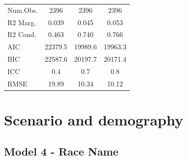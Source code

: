 \documentclass[]{report}
\begin{document}
\begin{table}
{\begin{tabular}[t]{lccc}
		\midrule
		Num.Obs. & \num{2396} & \num{2396} & \num{2396}\\
		R2 Marg. & \num{0.039} & \num{0.045} & \num{0.053}\\
		R2 Cond. & \num{0.463} & \num{0.740} & \num{0.766}\\
		AIC & \num{22379.5} & \num{19989.6} & \num{19963.3}\\
		BIC & \num{22587.6} & \num{20197.7} & \num{20171.4}\\
		ICC & \num{0.4} & \num{0.7} & \num{0.8}\\
		RMSE & \num{19.89} & \num{10.34} & \num{10.12}\\
		\bottomrule
	\end{tabular}}
\end{table}


\part{Scenario and demography}

\chapter{Model 4 - Race Name}
\end{document}
